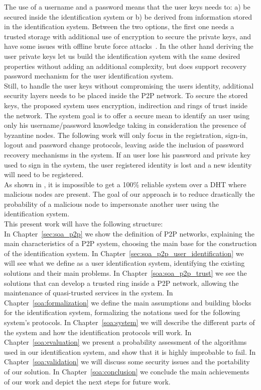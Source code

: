 The use of a username and a password means that the user keys needs to: a) be
secured inside the identification system or b) be derived from information
stored in the identification system. Between  the two options, the first one
needs a trusted storage with additional use of encryption to secure the
private keys, and have some issues with offline brute force
attacks~\cite{kreitz2012passwords}. In the other hand deriving the user private
keys let us build the identification system with the same desired properties without adding an
additional complexity, but does support recovery password mechanism for the
user identification system.\\
Still, to handle the user keys without compromising the users identity, additional
security layers needs to be placed inside the P2P network.
To secure the stored keys, the proposed system uses encryption, indirection and
rings of trust inside the network. The system goal is to offer a secure mean to
identify an user using only his username/password knowledge taking in
consideration the presence of byzantine nodes. The following work will only
focus in the registration, sign-in, logout and password change protocols,
leaving aside the inclusion of password recovery mechanisms in the system. If
an user lose his password and private key used to sign in the system, the user
registered identity is lost and a new identity will need to be registered.\\

As shown in \cite{the_sybil_attack}, it is impossible to get a 100\% reliable
system over a DHT where malicious nodes are present. The goal of our approach
is to reduce drastically the probability of a malicious node to impersonate
another user using the identification system.\\


This present work will have the following structure:\\

In Chapter~\ref{sec:soa_p2p} we show the definition of P2P networks, explaining the
main characteristics of a P2P system, choosing the main base for the
construction of the identification system. In
Chapter~\ref{sec:soa_p2p_user_identification} we will see what we define as a
user identification system, identifying the existing solutions and their main
problems. In Chapter~\ref{soa:soa_p2p_trust} we see the solutions that can
develop a trusted ring inside a P2P network, allowing the maintenance of
quasi-trusted services in the system.  
In Chapter~\ref{soa:formalization} we define the main assumptions and building
blocks for the
identification system, formalizing the notations used for the following system's protocols.
In Chapter~\ref{soa:system}  we will describe the different parts of the system and how the
identification protocols will work.
In Chapter~\ref{soa:evaluation} we present a probability assessment of
the algorithms used in our identification system, and show that it is highly
improbable to fail.
In Chapter~\ref{soa:validation} we will discuss some security issues and the portability of our
solution.
In Chapter~\ref{soa:conclusion} we conclude the main achievements of our work
and depict the next steps for future work.
